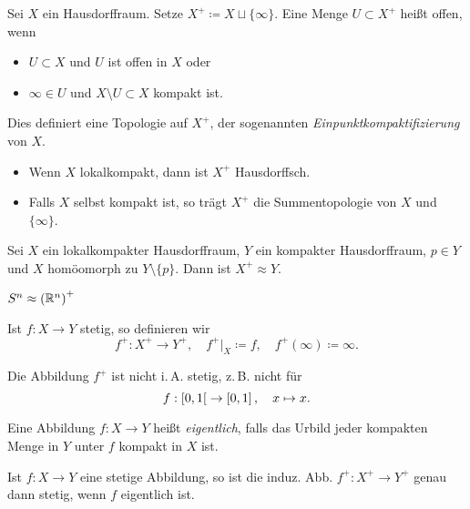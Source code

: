 \documentclass{cheat-sheet}
\begin{document}
\begin{defn}
  Sei $X$ ein Hausdorffraum. Setze $X^+ \coloneqq X \sqcup \{ \infty \}$. Eine Menge $U \subset X^+$ heißt offen, wenn
  \begin{itemize}
    \item $U \subset X$ und $U$ ist offen in $X$ oder
    \item $\infty \in U$ und $X \setminus U \subset X$ kompakt ist.
  \end{itemize}
  Dies definiert eine Topologie auf $X^+$, der sogenannten \emph{Einpunktkompaktifizierung} von $X$.
\end{defn}

\begin{bem}
  \begin{itemize}
    \item Wenn $X$ lokalkompakt, dann ist $X^+$ Hausdorffsch.
    \item Falls $X$ selbst kompakt ist, so trägt $X^+$ die Summentopologie von $X$ und $\{ \infty \}$.
  \end{itemize}
\end{bem}

\begin{prop}
  Sei $X$ ein lokalkompakter Hausdorffraum, $Y$ ein kompakter Hausdorffraum, $p \in Y$ und $X$ homöomorph zu $Y \setminus \{ p \}$. Dann ist $X^+ \approx Y$.
\end{prop}

\begin{kor}
  $S^n \approx \left(\mathbb{R}^n\right)^+$
\end{kor}

\begin{nota}
  Ist $f : X \to Y$ stetig, so definieren wir
  \[ f^+ : X^+ \to Y^+, \quad f^+|_X \coloneqq f, \quad f^+(\infty) \coloneqq \infty. \]
\end{nota}

\begin{bem}
  Die Abbildung $f^+$ ist nicht i.\,A. stetig, z.\,B. nicht für
  \[ f : \left[ 0, 1 \right[ \to \left[ 0, 1 \right], \quad x \mapsto x. \]
\end{bem}

\begin{defn}
  Eine Abbildung $f : X \to Y$ heißt \emph{eigentlich}, falls das Urbild jeder kompakten Menge in $Y$ unter $f$ kompakt in $X$ ist.
\end{defn}

\begin{prop}
  Ist $f : X \to Y$ eine stetige Abbildung, so ist die induz. Abb. $f^+ : X^+ \to Y^+$ genau dann stetig, wenn $f$ eigentlich ist.
\end{prop}
\end{document}
